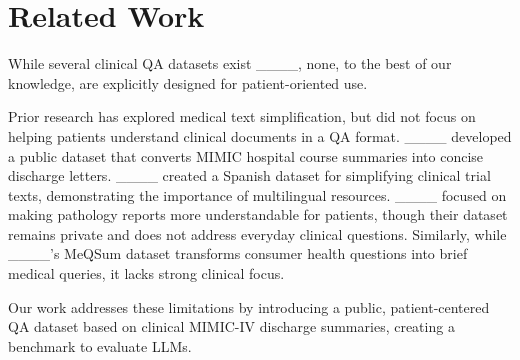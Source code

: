 \section{Related Work}
While several clinical QA datasets exist ____, none, to the best of our knowledge, are explicitly designed for patient-oriented use. 

Prior research has explored medical text simplification, but did not focus on helping patients understand clinical documents in a QA format. ____ developed a public dataset that converts MIMIC hospital course summaries into concise discharge letters. ____ created a Spanish dataset for simplifying clinical trial texts, demonstrating the importance of multilingual resources. ____ focused on making pathology reports more understandable for patients, though their dataset remains private and does not address everyday clinical questions. Similarly, while ____'s MeQSum dataset transforms consumer health questions into brief medical queries, it lacks strong clinical focus.

Our work addresses these limitations by introducing a public, patient-centered QA dataset based on clinical MIMIC-IV discharge summaries, creating a benchmark to evaluate LLMs.